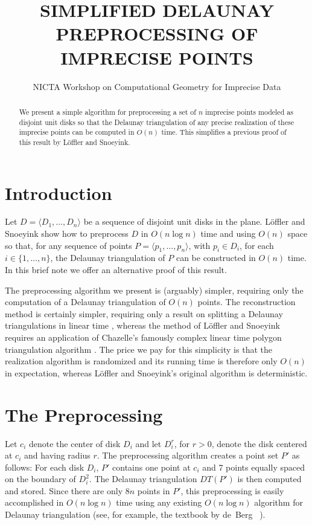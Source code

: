 \documentclass[lotsofwhite]{patmorin}
\title{\MakeUppercase{Simplified Delaunay Preprocessing of Imprecise Points}}
\author{NICTA Workshop on Computational Geometry for Imprecise Data}
\begin{document}
\maketitle

\begin{abstract}
We present a simple algorithm for preprocessing a set of $n$ imprecise
points modeled as disjoint unit disks so that the Delaunay triangulation of
any precise realization of these imprecise points can be computed in
$O(n)$ time.  This simplifies a previous proof of this result by
L\"offler and Snoeyink.
\end{abstract}

\section{Introduction}

Let $D=\langle D_1,\ldots,D_n\rangle$ be a sequence of disjoint unit
disks in the plane.  L\"offler and Snoeyink \cite{ls08} show how to
preprocess $D$ in $O(n\log n)$ time and using $O(n)$ space so that,
for any sequence of points $P=\langle p_1,\ldots,p_n\rangle$, with
$p_i\in D_i$, for each $i\in\{1,\ldots,n\}$, the Delaunay triangulation
of $P$ can be constructed in $O(n)$ time.  In this brief note we offer
an alternative proof of this result.

The preprocessing algorithm we present is (arguably) simpler,
requiring only the computation of a Delaunay triangulation of $O(n)$
points.  The reconstruction method is certainly simpler, requiring
only a result on splitting a Delaunay triangulations in linear time
\cite{cdhmst02}, whereas the method of L\"offler and Snoeyink requires
an application of Chazelle's famously complex linear time polygon
triangulation algorithm \cite{c90}.  The price we pay for this
simplicity is that the realization algorithm is randomized and its
running time is therefore only $O(n)$ in expectation, whereas
L\"offler and Snoeyink's original algorithm is deterministic.

\section{The Preprocessing}

Let $c_i$ denote the center of disk $D_i$ and let $D_i^r$, for $r >0$,
denote the disk centered at $c_i$ and having radius $r$.  The
preprocessing algorithm creates a point set $P'$ as follows:  For each
disk $D_i$, $P'$ contains one point at $c_i$ and 7 points equally
spaced on the boundary of $D_i^2$. The Delaunay triangulation $DT(P')$
is then computed and stored.  Since there are only $8n$ points in
$P'$, this preprocessing is easily accomplished in $O(n\log n)$ time
using any existing $O(n\log n)$ algorithm for Delaunay triangulation
(see, for example, the textbook by de~Berg \etal\
\cite[Section~9]{bcko08}).
\end{document}

